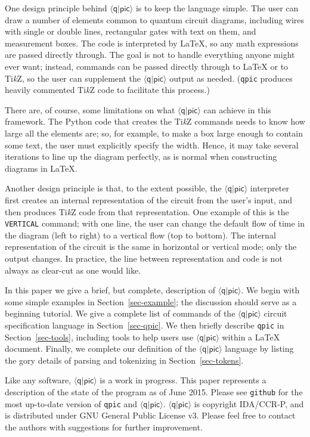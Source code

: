 \documentclass[twoside,12pt]{article}
\newcommand{\qpic}{$\langle\mathsf{q}|\mathsf{pic}\rangle$\xspace}
\newcommand{\qpicpy}{{\tt qpic}\xspace}
\newcommand{\TikZ}{Ti\emph{k}Z\xspace}
\begin{document}
One design principle behind \qpic is to keep the language simple.  The user can draw a number of
elements common to quantum circuit diagrams, including wires with single or double lines, rectangular
gates with text on them, and measurement boxes.  The code is interpreted by \LaTeX, so any math expressions
are passed directly through.  The goal is not to handle everything anyone might ever want; instead,
commands can be passed directly through to {\LaTeX} or to \TikZ, so the user can supplement the \qpic output
as needed.  (\qpicpy produces heavily commented \TikZ code to facilitate this process.)


There are, of course, some limitations on what \qpic can achieve in this framework.  The Python code
that creates the \TikZ commands needs to know how large all the elements are; so, for example, to make
a box large enough to contain some text, the user must explicitly specify the width.  Hence, it may
take several iterations to line up the diagram perfectly, as is normal when constructing diagrams in \LaTeX.


Another design principle is that, to the extent possible, the \qpic interpreter
first creates an internal representation
of the circuit from the user's input, and then produces \TikZ code from that representation.  One example
of this is the {\tt VERTICAL} command; with one line, the user can change the default flow of time in the
diagram (left to right) to a vertical flow (top to bottom).  The internal representation of the circuit is
the same in horizontal or vertical mode; only the output changes.  In practice, the line between
representation and code is not always as clear-cut as one would like.


In this paper we give a brief, but complete, description of \qpic.  We begin with some simple examples in
Section~\ref{sec-example}; the discussion should serve as a beginning tutorial.  
We give a complete list of commands of the \qpic circuit specification language
in Section~\ref{sec-qpic}.  We then briefly describe \qpicpy in Section~\ref{sec-tools}, including
tools to help users use \qpic within a {\LaTeX} document.  Finally, we complete our definition of the
\qpic language by listing the gory details of parsing and tokenizing in Section~\ref{sec-tokens}.

Like any software, \qpic is a work in progress.  This paper represents a description of the state of
the program as of June 2015.  Please see {\tt github} for the most up-to-date version of \qpicpy and \qpic.  \qpic is copyright IDA/CCR-P, and is distributed
under GNU General Public License v3. 
Please feel free to contact the authors with suggestions for further improvement.
\end{document}
